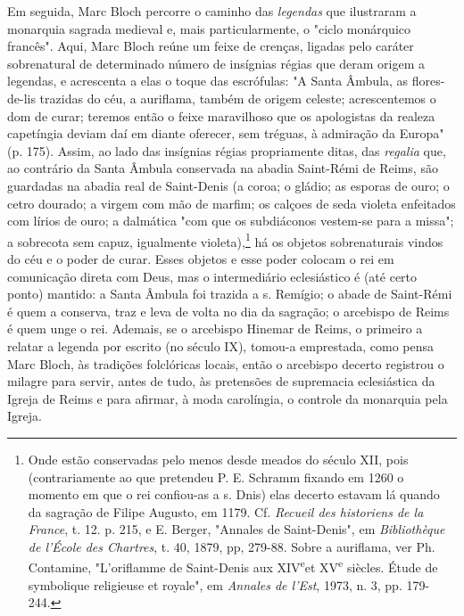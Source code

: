 \documentclass[a5paper]{book}
\begin{document}
Em seguida, Marc Bloch percorre o caminho das \textit{legendas} que ilustraram a monarquia sagrada medieval e, mais particularmente, o "ciclo monárquico francês". Aqui, Marc Bloch reúne um feixe de crenças, ligadas pelo caráter sobrenatural de determinado número de insígnias régias que deram origem a legendas, e acrescenta a elas o toque das escrófulas: "A Santa Âmbula, as f{\kern0pt}lores-de-lis trazidas do céu, a aurif{\kern0pt}lama, também de origem celeste; acrescentemos o dom de curar; teremos então o feixe maravilhoso que os apologistas da realeza capetíngia deviam daí em diante oferecer, sem tréguas, à admiração da Europa" (p. 175). Assim, ao lado das insígnias régias propriamente ditas, das \textit{regalia} que, ao contrário da Santa Âmbula conservada na abadia Saint-Rémi de Reims, são guardadas na abadia real de Saint-Denis (a coroa; o gládio; as esporas de ouro; o cetro dourado; a virgem com mão de marf{\kern0pt}im; os calçoes de seda violeta enfeitados com lírios de ouro; a dalmática "com que os subdiáconos vestem-se para a missa"; a sobrecota sem capuz, igualmente violeta),\footnote{Onde estão conservadas pelo menos desde meados do século XII, pois (contrariamente ao que pretendeu P. E. Schramm f{\kern0pt}ixando em 1260 o momento em que o rei conf{\kern0pt}iou-as a s. Dnis) elas decerto estavam lá quando da sagração de Filipe Augusto, em 1179. Cf. \textit{Recueil des historiens de la France}, t. 12. p. 215, e E. Berger, "Annales de Saint-Denis", em \textit{Bibliothèque de l'École des Chartres}, t. 40, 1879, pp, 279-88. Sobre a aurif{\kern0pt}lama, ver Ph. Contamine, "L'orif{\kern0pt}lamme de Saint-Denis aux  XIV\textsuperscript e\textnormal et XV\textsuperscript e \textnormal siècles. Étude de symbolique religieuse et royale", em \textit{Annales de l'Est}, 1973, n. 3, pp. 179-244.} há os objetos sobrenaturais vindos do céu e o poder de curar. Esses objetos e esse poder colocam o rei em comunicação direta com Deus, mas o intermediário eclesiástico é (até certo ponto) mantido: a Santa Âmbula foi trazida a s. Remígio; o abade de Saint-Rémi é quem a conserva, traz e leva de volta no dia da sagração; o arcebispo de Reims é quem unge o rei. Ademais, se o arcebispo Hinemar de Reims, o primeiro a relatar a legenda por escrito (no século IX), tomou-a emprestada, como pensa Marc Bloch, às tradições folclóricas locais, então o arcebispo decerto registrou o milagre para servir, antes de tudo, às pretensões de supremacia eclesiástica da Igreja de Reims e para af{\kern0pt}irmar, à moda carolíngia, o controle da monarquia pela Igreja.
\end{document}
